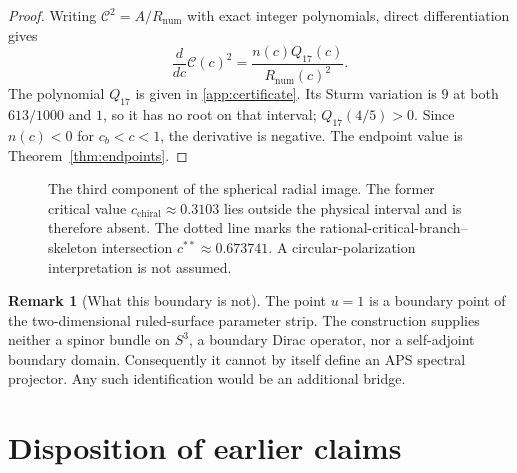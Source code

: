\documentclass[11pt]{article}
\theoremstyle{definition}
\newtheorem{remark}[theorem]{Remark}
\newcommand{\cb}{0.613055096856276}
\newcommand{\cabs}{0.673741152200546}
\begin{document}
\begin{proof}
Writing $\mathcal C^2=A/R_{\mathrm{num}}$ with exact integer polynomials,
direct differentiation gives
\begin{equation}
\frac{d}{dc}\mathcal C(c)^2
=\frac{n(c)Q_{17}(c)}{R_{\mathrm{num}}(c)^2}.
\end{equation}
The polynomial $Q_{17}$ is given in
\cref{app:certificate}.  Its Sturm variation is $9$ at both $613/1000$ and
$1$, so it has no root on that interval; $Q_{17}(4/5)>0$.  Since
$n(c)<0$ for $c_b<c<1$, the derivative is negative.  The endpoint value is
Theorem~\ref{thm:endpoints}.
\end{proof}

\begin{figure}[t]
\centering
{}
\caption{The third component of the spherical radial image.  The former
critical value $c_{\mathrm{chiral}}\approx0.3103$ lies outside the physical
interval and is therefore absent.  The dotted line marks the
rational-critical-branch--skeleton intersection
$c^{**}\approx0.673741$.  A circular-polarization interpretation is not
assumed.}
\label{fig:chirality}
\end{figure}

\begin{remark}[What this boundary is not]
The point $u=1$ is a boundary point of the two-dimensional ruled-surface
parameter strip.  The construction supplies neither a spinor bundle on
$S^3$, a boundary Dirac operator, nor a self-adjoint boundary domain.
Consequently it cannot by itself define an APS spectral projector.  Any such
identification would be an additional bridge.
\end{remark}

\clearpage
\section{Disposition of earlier claims}
\end{document}
